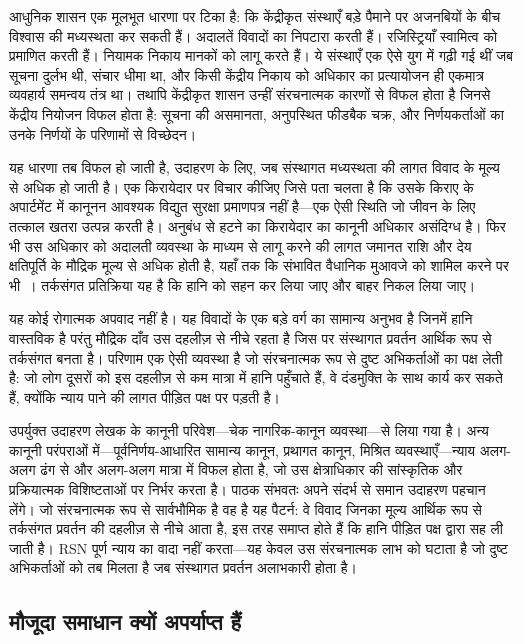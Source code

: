 \documentclass[11pt,a4paper,twocolumn]{article}
\begin{document}
आधुनिक शासन एक मूलभूत धारणा पर टिका है: कि केंद्रीकृत संस्थाएँ बड़े पैमाने पर अजनबियों के बीच विश्वास की मध्यस्थता कर सकती हैं। अदालतें विवादों का निपटारा करती हैं। रजिस्ट्रियाँ स्वामित्व को प्रमाणित करती हैं। नियामक निकाय मानकों को लागू करते हैं। ये संस्थाएँ एक ऐसे युग में गढ़ी गई थीं जब सूचना दुर्लभ थी, संचार धीमा था, और किसी केंद्रीय निकाय को अधिकार का प्रत्यायोजन ही एकमात्र व्यवहार्य समन्वय तंत्र था। तथापि केंद्रीकृत शासन उन्हीं संरचनात्मक कारणों से विफल होता है जिनसे केंद्रीय नियोजन विफल होता है: सूचना की असमानता, अनुपस्थित फीडबैक चक्र, और निर्णयकर्ताओं का उनके निर्णयों के परिणामों से विच्छेदन।

यह धारणा तब विफल हो जाती है, उदाहरण के लिए, जब संस्थागत मध्यस्थता की लागत विवाद के मूल्य से अधिक हो जाती है। एक किरायेदार पर विचार कीजिए जिसे पता चलता है कि उसके किराए के अपार्टमेंट में कानूनन आवश्यक विद्युत सुरक्षा प्रमाणपत्र नहीं है---एक ऐसी स्थिति जो जीवन के लिए तत्काल खतरा उत्पन्न करती है। अनुबंध से हटने का किरायेदार का कानूनी अधिकार असंदिग्ध है। फिर भी उस अधिकार को अदालती व्यवस्था के माध्यम से लागू करने की लागत जमानत राशि और देय क्षतिपूर्ति के मौद्रिक मूल्य से अधिक होती है, यहाँ तक कि संभावित वैधानिक मुआवजे को शामिल करने पर भी~\cite{czcourtfees}। तर्कसंगत प्रतिक्रिया यह है कि हानि को सहन कर लिया जाए और बाहर निकल लिया जाए।

यह कोई रोगात्मक अपवाद नहीं है। यह विवादों के एक बड़े वर्ग का सामान्य अनुभव है जिनमें हानि वास्तविक है परंतु मौद्रिक दाँव उस दहलीज़ से नीचे रहता है जिस पर संस्थागत प्रवर्तन आर्थिक रूप से तर्कसंगत बनता है। परिणाम एक ऐसी व्यवस्था है जो संरचनात्मक रूप से दुष्ट अभिकर्ताओं का पक्ष लेती है: जो लोग दूसरों को इस दहलीज़ से कम मात्रा में हानि पहुँचाते हैं, वे दंडमुक्ति के साथ कार्य कर सकते हैं, क्योंकि न्याय पाने की लागत पीड़ित पक्ष पर पड़ती है।

उपर्युक्त उदाहरण लेखक के कानूनी परिवेश---चेक नागरिक-कानून व्यवस्था---से लिया गया है। अन्य कानूनी परंपराओं में---पूर्वनिर्णय-आधारित सामान्य कानून, प्रथागत कानून, मिश्रित व्यवस्थाएँ---न्याय अलग-अलग ढंग से और अलग-अलग मात्रा में विफल होता है, जो उस क्षेत्राधिकार की सांस्कृतिक और प्रक्रियात्मक विशिष्टताओं पर निर्भर करता है। पाठक संभवतः अपने संदर्भ से समान उदाहरण पहचान लेंगे। जो संरचनात्मक रूप से सार्वभौमिक है वह है यह पैटर्न: वे विवाद जिनका मूल्य आर्थिक रूप से तर्कसंगत प्रवर्तन की दहलीज़ से नीचे आता है, इस तरह समाप्त होते हैं कि हानि पीड़ित पक्ष द्वारा सह ली जाती है। RSN पूर्ण न्याय का वादा नहीं करता---यह केवल उस संरचनात्मक लाभ को घटाता है जो दुष्ट अभिकर्ताओं को तब मिलता है जब संस्थागत प्रवर्तन अलाभकारी होता है।

\subsection{मौजूदा समाधान क्यों अपर्याप्त हैं}
\end{document}
